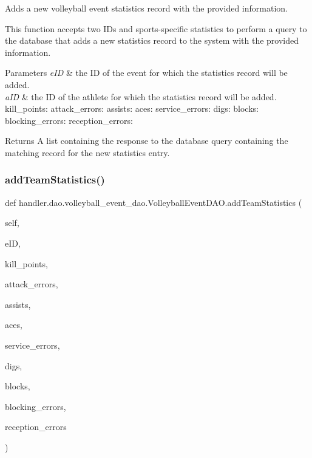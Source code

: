 Adds a new volleyball event statistics record with the provided information. 

This function accepts two I\+Ds and sports-\/specific statistics to perform a query to the database that adds a new statistics record to the system with the provided information.


\begin{DoxyParams}{Parameters}
{\em e\+ID} & the ID of the event for which the statistics record will be added. \\
\hline
{\em a\+ID} & the ID of the athlete for which the statistics record will be added. kill\+\_\+points\+: attack\+\_\+errors\+: assists\+: aces\+: service\+\_\+errors\+: digs\+: blocks\+: blocking\+\_\+errors\+: reception\+\_\+errors\+:\\
\hline
\end{DoxyParams}
\begin{DoxyReturn}{Returns}
A list containing the response to the database query containing the matching record for the new statistics entry. 
\end{DoxyReturn}
\mbox{\label{classhandler_1_1dao_1_1volleyball__event__dao_1_1_volleyball_event_d_a_o_a4648b391f6897b4e6d5a5802b5627511}} 
\subsubsection{\texorpdfstring{add\+Team\+Statistics()}{addTeamStatistics()}}
{\footnotesize\ttfamily def handler.\+dao.\+volleyball\+\_\+event\+\_\+dao.\+Volleyball\+Event\+D\+A\+O.\+add\+Team\+Statistics (\begin{DoxyParamCaption}\item[{}]{self,  }\item[{}]{e\+ID,  }\item[{}]{kill\+\_\+points,  }\item[{}]{attack\+\_\+errors,  }\item[{}]{assists,  }\item[{}]{aces,  }\item[{}]{service\+\_\+errors,  }\item[{}]{digs,  }\item[{}]{blocks,  }\item[{}]{blocking\+\_\+errors,  }\item[{}]{reception\+\_\+errors }\end{DoxyParamCaption})}



